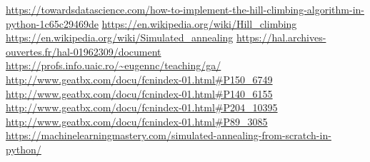 \documentclass[12pt]{article}
\begin{document}
\begin{thebibliography}{9}
  \bibitem{}
    \url{https://towardsdatascience.com/how-to-implement-the-hill-climbing-algorithm-in-python-1c65c29469de}
  \bibitem{}
    \url{https://en.wikipedia.org/wiki/Hill_climbing}
  \bibitem{}
    \url{https://en.wikipedia.org/wiki/Simulated_annealing}
  \bibitem{}
    \url{https://hal.archives-ouvertes.fr/hal-01962309/document}
  \bibitem{}
    \url{https://profs.info.uaic.ro/~eugennc/teaching/ga/}
  \bibitem{}
    \url{http://www.geatbx.com/docu/fcnindex-01.html#P150_6749}
  \bibitem{}
    \url{http://www.geatbx.com/docu/fcnindex-01.html#P140_6155}
  \bibitem{}
    \url{http://www.geatbx.com/docu/fcnindex-01.html#P204_10395}
  \bibitem{}
    \url{http://www.geatbx.com/docu/fcnindex-01.html#P89_3085}
  \bibitem{}
    \url{https://machinelearningmastery.com/simulated-annealing-from-scratch-in-python/}
  \end{thebibliography}  
  
\end{document}
